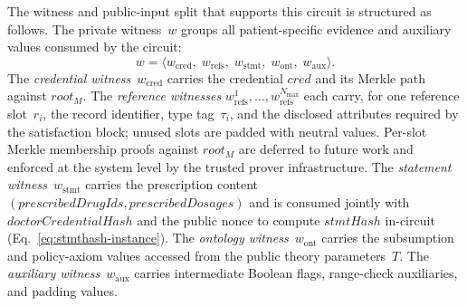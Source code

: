 \documentclass[journal]{IEEEtran}
\begin{document}
The witness and public-input split that supports this circuit
is structured as follows.
The private witness~$w$ groups all patient-specific evidence
and auxiliary values consumed by the circuit:
\begin{equation}
w =
\langle
w_{\mathrm{cred}},\;
w_{\mathrm{refs}},\;
w_{\mathrm{stmt}},\;
w_{\mathrm{ont}},\;
w_{\mathrm{aux}}
\rangle.
\label{eq:witness-struct}
\end{equation}
The \emph{credential witness}~$w_{\mathrm{cred}}$ carries the
credential $\mathit{cred}$ and its Merkle path against
$\mathit{root}_M$.
The \emph{reference witnesses}
$w_{\mathrm{refs}}^{1},\dots,w_{\mathrm{refs}}^{N_{\max}}$
each carry, for one reference slot~$r_i$, the record
identifier, type tag~$\tau_i$, and the disclosed attributes
required by the satisfaction block; unused slots are padded
with neutral values. Per-slot Merkle membership proofs against
$\mathit{root}_M$ are deferred to future work and enforced at
the system level by the trusted prover infrastructure.
The \emph{statement witness}~$w_{\mathrm{stmt}}$ carries the
prescription content $(\mathit{prescribedDrugIds}, \mathit{prescribedDosages})$
and is consumed jointly with $\mathit{doctorCredentialHash}$ and the
public nonce to compute $\mathit{stmtHash}$ in-circuit
(Eq.~\ref{eq:stmthash-instance}).
The \emph{ontology witness}~$w_{\mathrm{ont}}$ carries the
subsumption and policy-axiom values accessed from the
public theory parameters~$T$.
The \emph{auxiliary witness}~$w_{\mathrm{aux}}$ carries
intermediate Boolean flags, range-check auxiliaries, and
padding values.
\end{document}
